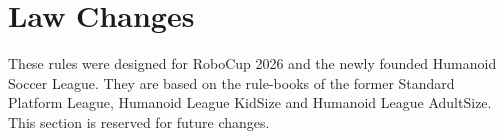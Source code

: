 
\section{Law Changes}
\label{sec:Changes}


These rules were designed for RoboCup 2026 and the newly founded Humanoid Soccer League. 
They are based on the rule-books of the former Standard Platform League, Humanoid League KidSize and Humanoid League AdultSize.
This section is reserved for future changes.



